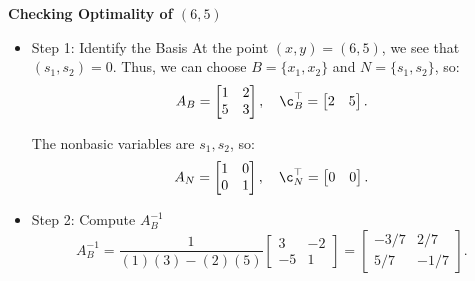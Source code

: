 \begin{solution} \textbf{Checking Optimality of \( (6,5) \)}

\begin{itemize}
\item {Step 1: Identify the Basis}
At the point $(x,y) = (6,5)$, we see that $(s_1, s_2) = 0$.  Thus, we can choose 
 \(B= \{x_1, x_2\} \) and $N = \{s_1, s_2\}$, so:
\[
A_B =
\begin{bmatrix}
    1 & 2 \\
    5 & 3
\end{bmatrix}, \quad
\c_B^\top =
\begin{bmatrix}
    2 & 5
\end{bmatrix}.
\]

The nonbasic variables are \( s_1, s_2 \), so:
\[
A_N =
\begin{bmatrix}
    1 & 0 \\
    0 & 1
\end{bmatrix}, \quad
\c_N^\top =
\begin{bmatrix}
    0 & 0
\end{bmatrix}.
\]

\item {Step 2: Compute \( A_B^{-1} \)}
\[
A_B^{-1} =
\frac{1}{(1)(3) - (2)(5)}
\begin{bmatrix}
    3 & -2 \\
    -5 & 1
\end{bmatrix}
=
\begin{bmatrix}
    -3/7 & 2/7 \\
    5/7 & -1/7
\end{bmatrix}.
\]


\end{itemize}
\end{solution}
